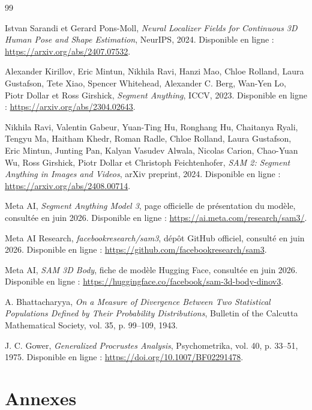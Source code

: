 \documentclass[11pt,a4paper]{article}
\begin{document}
\begin{thebibliography}{99}

Istvan Sarandi et Gerard Pons-Moll,
\textit{Neural Localizer Fields for Continuous 3D Human Pose and Shape Estimation},
NeurIPS, 2024.
Disponible en ligne : \url{https://arxiv.org/abs/2407.07532}.

Alexander Kirillov, Eric Mintun, Nikhila Ravi, Hanzi Mao, Chloe Rolland, Laura Gustafson, Tete Xiao, Spencer Whitehead, Alexander C. Berg, Wan-Yen Lo, Piotr Dollar et Ross Girshick,
\textit{Segment Anything},
ICCV, 2023.
Disponible en ligne : \url{https://arxiv.org/abs/2304.02643}.

Nikhila Ravi, Valentin Gabeur, Yuan-Ting Hu, Ronghang Hu, Chaitanya Ryali, Tengyu Ma, Haitham Khedr, Roman Radle, Chloe Rolland, Laura Gustafson, Eric Mintun, Junting Pan, Kalyan Vasudev Alwala, Nicolas Carion, Chao-Yuan Wu, Ross Girshick, Piotr Dollar et Christoph Feichtenhofer,
\textit{SAM 2: Segment Anything in Images and Videos},
arXiv preprint, 2024.
Disponible en ligne : \url{https://arxiv.org/abs/2408.00714}.

Meta AI,
\textit{Segment Anything Model 3},
page officielle de présentation du modèle, consultée en juin 2026.
Disponible en ligne : \url{https://ai.meta.com/research/sam3/}.

Meta AI Research,
\textit{facebookresearch/sam3},
dépôt GitHub officiel, consulté en juin 2026.
Disponible en ligne : \url{https://github.com/facebookresearch/sam3}.

Meta AI,
\textit{SAM 3D Body},
fiche de modèle Hugging Face, consultée en juin 2026.
Disponible en ligne : \url{https://huggingface.co/facebook/sam-3d-body-dinov3}.

A. Bhattacharyya,
\textit{On a Measure of Divergence Between Two Statistical Populations Defined by Their Probability Distributions},
Bulletin of the Calcutta Mathematical Society, vol. 35, p. 99--109, 1943.

J. C. Gower,
\textit{Generalized Procrustes Analysis},
Psychometrika, vol. 40, p. 33--51, 1975.
Disponible en ligne : \url{https://doi.org/10.1007/BF02291478}.

\end{thebibliography}

\newpage
\appendix
\section{Annexes}
\end{document}
